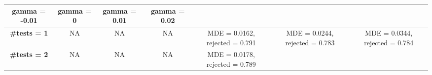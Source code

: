 \documentclass[
]{article}
\begin{document}
\begin{longtable}[]{@{}ccccccc@{}}
\begin{minipage}[b]{0.08\columnwidth}
gamma = -0.01\strut
\end{minipage} & \begin{minipage}[b]{0.16\columnwidth}\centering
gamma = 0\strut
\end{minipage} & \begin{minipage}[b]{0.16\columnwidth}\centering
gamma = 0.01\strut
\end{minipage} & \begin{minipage}[b]{0.16\columnwidth}\centering
gamma = 0.02\strut
\end{minipage}\tabularnewline
\midrule
\endhead
\begin{minipage}[t]{0.08\columnwidth}\centering
\textbf{\#tests = 1}\strut
\end{minipage} & \begin{minipage}[t]{0.08\columnwidth}\centering
NA\strut
\end{minipage} & \begin{minipage}[t]{0.08\columnwidth}\centering
NA\strut
\end{minipage} & \begin{minipage}[t]{0.08\columnwidth}\centering
NA\strut
\end{minipage} & \begin{minipage}[t]{0.16\columnwidth}\centering
MDE = 0.0162, rejected = 0.791\strut
\end{minipage} & \begin{minipage}[t]{0.16\columnwidth}\centering
MDE = 0.0244, rejected = 0.783\strut
\end{minipage} & \begin{minipage}[t]{0.16\columnwidth}\centering
MDE = 0.0344, rejected = 0.784\strut
\end{minipage}\tabularnewline
\begin{minipage}[t]{0.08\columnwidth}\centering
\textbf{\#tests = 2}\strut
\end{minipage} & \begin{minipage}[t]{0.08\columnwidth}\centering
NA\strut
\end{minipage} & \begin{minipage}[t]{0.08\columnwidth}\centering
NA\strut
\end{minipage} & \begin{minipage}[t]{0.08\columnwidth}\centering
NA\strut
\end{minipage} & \begin{minipage}[t]{0.16\columnwidth}\centering
MDE = 0.0178, rejected = 0.789\strut
\end{minipage} & \begin{minipage}[t]{0.16\columnwidth}\centering

\end{minipage}
\end{longtable}
\end{document}
